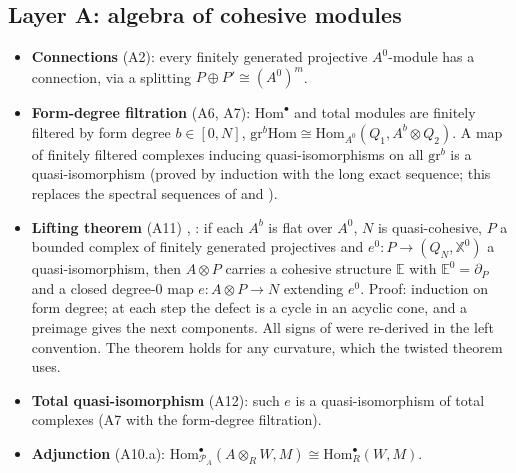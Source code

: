 \documentclass[11pt,a4paper]{article}
\newcommand{\Hom}{\mathrm{Hom}}
\newcommand{\X}{\mathbb{X}}
\begin{document}
\subsection{Layer A: algebra of cohesive modules}
\begin{itemize}
\item \textbf{Connections} (A2): every finitely generated projective $A^0$-module has a
connection, via a splitting $P\oplus P'\cong(A^0)^m$.
\item \textbf{Form-degree filtration} (A6, A7): $\Hom^\bullet$ and total modules are finitely
filtered by form degree $b\in[0,N]$, $\mathrm{gr}^b\Hom\cong\Hom_{A^0}(Q_1,A^b\otimes Q_2)$. A map of
finitely filtered complexes inducing quasi-isomorphisms on all $\mathrm{gr}^b$ is a
quasi-isomorphism (proved by induction with the long exact sequence; this replaces the spectral
sequences of \cite{B} and \cite{A}).
\item \textbf{Lifting theorem} (A11) \cite[Thm~3.2.7]{B}, \cite[Prop~3.3.4]{A}: if each $A^b$ is flat over
$A^0$, $N$ is quasi-cohesive, $P$ a bounded complex of finitely generated projectives and
$e^0\colon P\to(Q_N,\X^0)$ a quasi-isomorphism, then $A\otimes P$ carries a cohesive structure
$\mathbb E$ with $\mathbb E^0=\partial_P$ and a closed degree-0 map $e\colon A\otimes P\to N$ extending
$e^0$. Proof: induction on form degree; at each step the defect is a cycle in an acyclic cone,
and a preimage gives the next components. All signs of \cite{A} were re-derived in the left
convention. The theorem holds for any curvature, which the twisted theorem uses.
\item \textbf{Total quasi-isomorphism} (A12): such $e$ is a quasi-isomorphism of total
complexes (A7 with the form-degree filtration).
\item \textbf{Adjunction} (A10.a): $\Hom^\bullet_{\mathcal P_A}(A\otimes_RW,M)\cong\Hom^\bullet_R(W,M)$.
\end{itemize}
\end{document}
